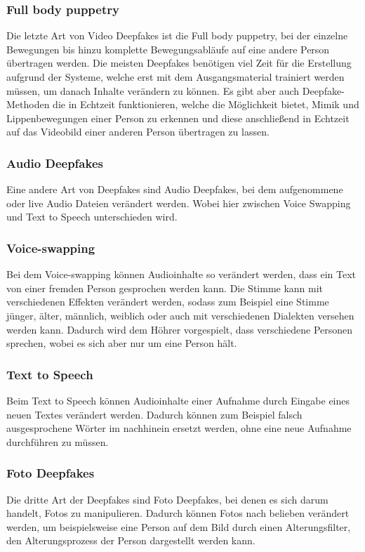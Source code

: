 \subsubsection{Full body puppetry}
Die letzte Art von Video Deepfakes ist die Full body puppetry, bei der einzelne Bewegungen bis hinzu komplette
Bewegungsabläufe auf eine andere Person übertragen werden.\newline
Die meisten Deepfakes benötigen viel Zeit für die Erstellung aufgrund der Systeme, welche erst mit dem Ausgangsmaterial trainiert werden müssen, um danach Inhalte verändern zu können.
Es gibt aber auch Deepfake-Methoden die in Echtzeit funktionieren, welche die Möglichkeit bietet, Mimik und Lippenbewegungen einer Person zu erkennen und diese anschließend in Echtzeit auf das Videobild einer anderen Person übertragen zu lassen.\cite{ResearchGate}

\subsubsection{Audio Deepfakes}
Eine andere Art von Deepfakes sind Audio Deepfakes, bei dem aufgenommene oder live Audio Dateien verändert werden. Wobei hier zwischen Voice Swapping und Text to Speech unterschieden wird.\cite{ResearchGate}

\subsubsection{Voice-swapping}
Bei dem Voice-swapping können Audioinhalte so verändert werden, dass ein Text von einer fremden Person gesprochen werden kann. Die Stimme kann mit verschiedenen Effekten verändert werden, sodass zum Beispiel eine Stimme jünger, älter, männlich, weiblich oder auch mit verschiedenen Dialekten versehen werden kann.
Dadurch wird dem Höhrer vorgespielt, dass verschiedene Personen sprechen, wobei es sich aber nur um eine Person hält.\cite{ResearchGate}

\subsubsection{Text to Speech}
Beim Text to Speech können Audioinhalte einer Aufnahme durch Eingabe eines neuen Textes verändert werden. Dadurch können zum Beispiel falsch ausgesprochene Wörter im nachhinein ersetzt werden, ohne eine neue Aufnahme durchführen zu müssen.\cite{ResearchGate}

\subsubsection{Foto Deepfakes}
Die dritte Art der Deepfakes sind Foto Deepfakes, bei denen es sich darum handelt, Fotos zu manipulieren. Dadurch können Fotos nach belieben verändert werden, um beispielsweise eine Person auf dem Bild durch einen Alterungsfilter, den Alterungsprozess der Person dargestellt werden kann.\cite{ResearchGate}

